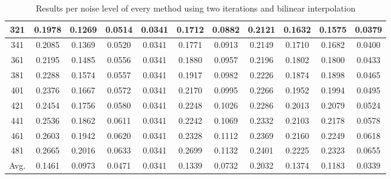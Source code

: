 \begin{table}[ht!]
\begin{tabular}{c|c|c|c|c|c|c|c|c|c|c}
321 & 0.1978 & 0.1269 & 0.0514 & 0.0341 & 0.1712 & 0.0882 & 0.2121 & 0.1632 & 0.1575 & 0.0379 \\ \hline
341 & 0.2085 & 0.1369 & 0.0520 & 0.0341 & 0.1771 & 0.0913 & 0.2149 & 0.1710 & 0.1682 & 0.0400 \\ \hline
361 & 0.2195 & 0.1485 & 0.0556 & 0.0341 & 0.1880 & 0.0957 & 0.2196 & 0.1802 & 0.1800 & 0.0433 \\ \hline
381 & 0.2288 & 0.1574 & 0.0557 & 0.0341 & 0.1917 & 0.0982 & 0.2226 & 0.1874 & 0.1898 & 0.0465 \\ \hline
401 & 0.2376 & 0.1667 & 0.0572 & 0.0341 & 0.2170 & 0.0995 & 0.2266 & 0.1952 & 0.1994 & 0.0495 \\ \hline
421 & 0.2454 & 0.1756 & 0.0580 & 0.0341 & 0.2248 & 0.1026 & 0.2286 & 0.2013 & 0.2079 & 0.0524 \\ \hline
441 & 0.2536 & 0.1862 & 0.0611 & 0.0341 & 0.2242 & 0.1069 & 0.2332 & 0.2103 & 0.2178 & 0.0578 \\ \hline
461 & 0.2603 & 0.1942 & 0.0620 & 0.0341 & 0.2328 & 0.1112 & 0.2369 & 0.2160 & 0.2249 & 0.0618 \\ \hline
481 & 0.2665 & 0.2016 & 0.0633 & 0.0341 & 0.2699 & 0.1132 & 0.2401 & 0.2225 & 0.2323 & 0.0655 \\ \hline
Avg.  & 0.1461 & 0.0973 & 0.0471 & 0.0341 & 0.1339 & 0.0732 & 0.2032 & 0.1374 & 0.1183 & 0.0339 \\ \hline
\end{tabular}
\caption{Results per noise level of every method using two iterations and bilinear interpolation}
\label{tab:2itLperNoise}
\end{table}


